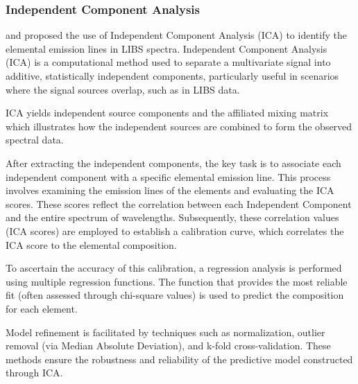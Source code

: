 \subsubsection{Independent Component Analysis}\label{sec:ica}
\citet{cleggRecalibrationMarsScience2017} and \citet{forniIndependentComponentAnalysis2013} proposed the use of Independent Component Analysis (ICA) to identify the elemental emission lines in LIBS spectra. Independent Component Analysis (ICA) is a computational method used to separate a multivariate signal into additive, statistically independent components, particularly useful in scenarios where the signal sources overlap, such as in LIBS data.

ICA yields independent source components and the affiliated mixing matrix which illustrates how the independent sources are combined to form the observed spectral data.

After extracting the independent components, the key task is to associate each independent component with a specific elemental emission line.
This process involves examining the emission lines of the elements and evaluating the ICA scores.
These scores reflect the correlation between each Independent Component and the entire spectrum of wavelengths.
Subsequently, these correlation values (ICA scores) are employed to establish a calibration curve, which correlates the ICA score to the elemental composition.

To ascertain the accuracy of this calibration, a regression analysis is performed using multiple regression functions. The function that provides the most reliable fit (often assessed through chi-square values) is used to predict the composition for each element.

Model refinement is facilitated by techniques such as normalization, outlier removal (via Median Absolute Deviation), and k-fold cross-validation. These methods ensure the robustness and reliability of the predictive model constructed through ICA.

